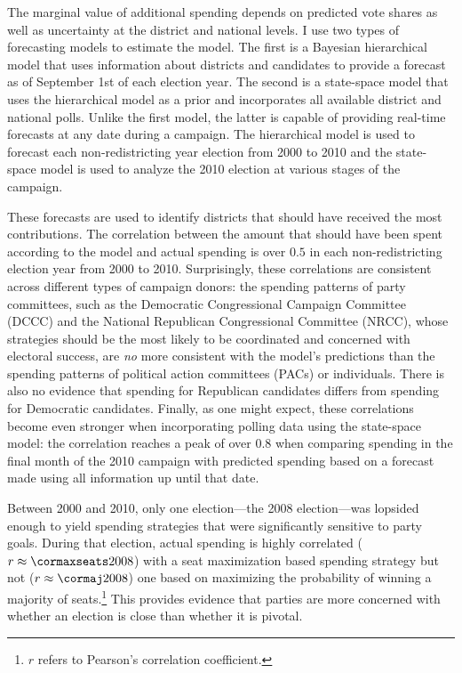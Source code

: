 \documentclass[12pt,final,fleqn]{article}
\theoremstyle{plain}
\begin{document}
The marginal value of additional spending depends on predicted vote shares as well as uncertainty at the district and national levels. I use two types of forecasting models to estimate the model. The first is a Bayesian hierarchical model that uses information about districts and candidates to provide a forecast as of September 1st of each election year. The second is a state-space model that uses the hierarchical model as a prior and incorporates all available district and national polls. Unlike the first model, the latter is capable of providing real-time forecasts at any date during a campaign. The hierarchical model is used to forecast each non-redistricting year election from 2000 to 2010 and the state-space model is used to analyze the 2010 election at various stages of the campaign.

These forecasts are used to identify districts that should have received the most contributions. The correlation between the amount that should have been spent according to the model and actual spending is over $0.5$ in each non-redistricting election year from 2000 to 2010. Surprisingly, these correlations are consistent across different types of campaign donors: the spending patterns of party committees, such as the Democratic Congressional Campaign Committee (DCCC) and the National Republican Congressional Committee (NRCC), whose strategies should be the most likely to be coordinated and concerned with electoral success, are \emph{no} more consistent with the model's predictions than the spending patterns of political action committees (PACs) or individuals. There is also no evidence that spending for Republican candidates differs from spending for Democratic candidates. Finally, as one might expect, these correlations become even stronger when incorporating polling data using the state-space model: the correlation reaches a peak of over 0.8 when comparing spending in the final month of the 2010 campaign with predicted spending based on a forecast made using all information up until that date.

Between 2000 and 2010, only one election---the 2008 election---was lopsided enough to yield spending strategies that were significantly sensitive to party goals. During that election, actual spending is highly correlated ($r \approx \cormaxseats2008$) with a seat maximization based spending strategy but not ($r \approx \cormaj2008$) one based on maximizing the probability of winning a majority of seats.\footnote{$r$ refers to Pearson's correlation coefficient.} This provides evidence that parties are more concerned with whether an election is close than whether it is pivotal. 
\end{document}
